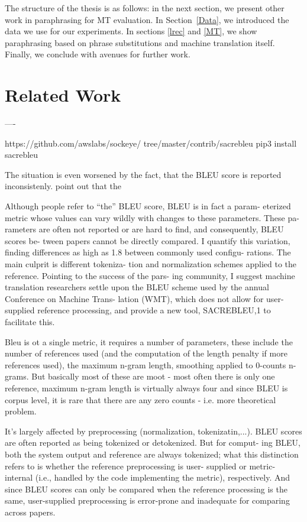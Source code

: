 \documentclass[11pt]{article}
\def\Sref#1{Section~\ref{#1}}
\begin{document}
The structure of the thesis is as follows: in the next section, we present 
other work in paraphrasing for MT evaluation. In \Sref{Data}, we introduced
the data we use for our experiments. In sections \ref{lrec} and \ref{MT}, 
we show paraphrasing based on phrase substitutions and machine translation 
itself. Finally, we conclude with avenues for further work.

\section{Related Work}
----

https://github.com/awslabs/sockeye/ tree/master/contrib/sacrebleu
pip3 install sacrebleu

The situation is even worsened by the fact, that the BLEU score is reported inconsistenly. \cite{post-2018-call} point out that the 

 Although people refer to “the” BLEU score, BLEU is in fact a param- eterized metric whose values can vary wildly with changes to these parameters. These pa- rameters are often not reported or are hard to find, and consequently, BLEU scores be- tween papers cannot be directly compared. I quantify this variation, finding differences as high as 1.8 between commonly used configu- rations. The main culprit is different tokeniza- tion and normalization schemes applied to the reference. Pointing to the success of the pars- ing community, I suggest machine translation researchers settle upon the BLEU scheme used by the annual Conference on Machine Trans- lation (WMT), which does not allow for user- supplied reference processing, and provide a new tool, SACREBLEU,1 to facilitate this.
 
 Bleu is ot a single metric, it requires a number of parameters, these include the number of references used (and the computation of the length penalty if more references used), the maximum n-gram length, smoothing applied to 0-counts n-grams. But basically most of these are moot - most often there is only one reference, maximum n-gram length is virtually always four and since BLEU is corpus level, it is rare that there are any zero counts - i.e. more theoretical problem.
 
 
 It's largely affected by preprocessing (normalization, tokenizatin,...). BLEU scores are often reported as being tokenized or detokenized. But for comput- ing BLEU, both the system output and reference are always tokenized; what this distinction refers to is whether the reference preprocessing is user- supplied or metric-internal (i.e., handled by the code implementing the metric), respectively. And since BLEU scores can only be compared when the reference processing is the same, user-supplied preprocessing is error-prone and inadequate for comparing across papers.
 
\end{document}
